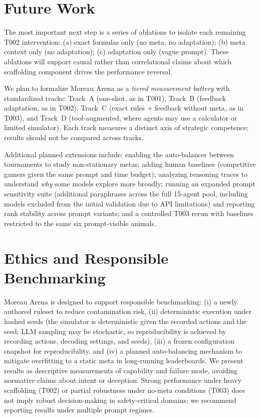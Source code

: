 \documentclass[11pt]{article}
\newcommand{\tOne}{T001}
\newcommand{\tTwo}{T002}
\newcommand{\tThree}{T003}
\begin{document}
\section{Future Work}
\label{sec:future}

The most important next step is a series of ablations to isolate each remaining \tTwo{} intervention:
(a) exact formulas only (no meta, no adaptation);
(b) meta context only (no adaptation);
(c) adaptation only (vague prompt).
These ablations will support causal rather than correlational claims about which scaffolding component drives the performance reversal.

We plan to formalize Moreau Arena as a \emph{tiered measurement battery} with standardized tracks:
Track~A (one-shot, as in \tOne),
Track~B (feedback adaptation, as in \tTwo),
Track~C (exact rules + feedback without meta, as in \tThree),
and Track~D (tool-augmented, where agents may use a calculator or limited simulator).
Each track measures a distinct axis of strategic competence; results should not be compared across tracks.

Additional planned extensions include:
enabling the auto-balancer between tournaments to study non-stationary metas;
adding human baselines (competitive gamers given the same prompt and time budget);
analyzing reasoning traces to understand \emph{why} some models explore more broadly;
running an expanded prompt sensitivity suite (additional paraphrases across the full 15-agent pool, including models excluded from the initial validation due to API limitations) and reporting rank stability across prompt variants;
and a controlled \tThree{} rerun with baselines restricted to the same six prompt-visible animals.

\section{Ethics and Responsible Benchmarking}

Moreau Arena is designed to support responsible benchmarking:
(i) a newly authored ruleset to reduce contamination risk,
(ii) deterministic execution under hashed seeds (the simulator is deterministic given the recorded actions and the seed; LLM sampling may be stochastic, so reproducibility is achieved by recording actions, decoding settings, and seeds),
(iii) a frozen configuration snapshot for reproducibility,
and (iv) a planned auto-balancing mechanism to mitigate overfitting to a static meta in long-running leaderboards.
We present results as descriptive measurements of capability and failure mode, avoiding normative claims about intent or deception.
Strong performance under heavy scaffolding (\tTwo) or partial robustness under no-meta conditions (\tThree) does not imply robust decision-making in safety-critical domains; we recommend reporting results under multiple prompt regimes.
\end{document}
